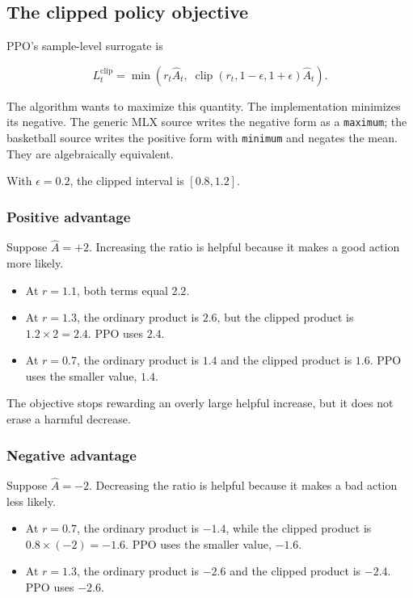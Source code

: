 \documentclass[
  american,
  11pt,
  letterpaper,
]{article}
\providecommand{\tightlist}{%
  \setlength{\itemsep}{0pt}\setlength{\parskip}{0pt}}
\begin{document}
\subsection{The clipped policy
objective}\label{the-clipped-policy-objective}

PPO's sample-level surrogate is

\[
L_t^{\mathrm{clip}}
=
\min\left(
r_t\widehat A_t,\;
\operatorname{clip}(r_t,1-\epsilon,1+\epsilon)\widehat A_t
\right).
\]

The algorithm wants to maximize this quantity. The implementation
minimizes its negative. The generic MLX source writes the negative form
as a \texttt{maximum}; the basketball source writes the positive form
with \texttt{minimum} and negates the mean. They are algebraically
equivalent.

With \(\epsilon=0.2\), the clipped interval is \([0.8,1.2]\).

\subsubsection{Positive advantage}\label{positive-advantage}

Suppose \(\widehat A=+2\). Increasing the ratio is helpful because it
makes a good action more likely.

\begin{itemize}
\tightlist
\item
  At \(r=1.1\), both terms equal \(2.2\).
\item
  At \(r=1.3\), the ordinary product is \(2.6\), but the clipped product
  is \(1.2\times2=2.4\). PPO uses \(2.4\).
\item
  At \(r=0.7\), the ordinary product is \(1.4\) and the clipped product
  is \(1.6\). PPO uses the smaller value, \(1.4\).
\end{itemize}

The objective stops rewarding an overly large helpful increase, but it
does not erase a harmful decrease.

\subsubsection{Negative advantage}\label{negative-advantage}

Suppose \(\widehat A=-2\). Decreasing the ratio is helpful because it
makes a bad action less likely.

\begin{itemize}
\tightlist
\item
  At \(r=0.7\), the ordinary product is \(-1.4\), while the clipped
  product is \(0.8\times(-2)=-1.6\). PPO uses the smaller value,
  \(-1.6\).
\item
  At \(r=1.3\), the ordinary product is \(-2.6\) and the clipped product
  is \(-2.4\). PPO uses \(-2.6\).
\end{itemize}
\end{document}
